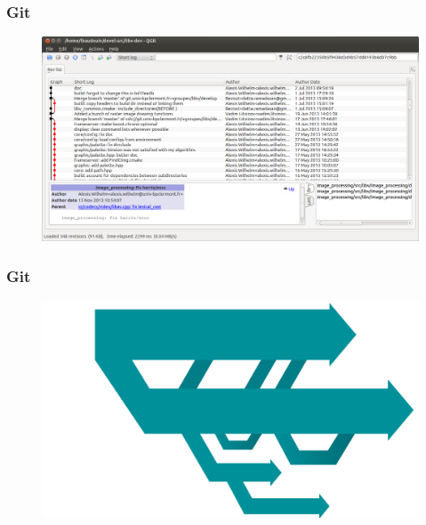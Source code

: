 \documentclass{beamer}
\begin{document}
\begin{frame}
  \frametitle{Git}

    \begin{figure}
    \includegraphics[height=0.7\textheight]{images/qgit}
    \end{figure}

\end{frame}

\begin{frame}
  \frametitle{Git}

    \begin{figure}
    \includegraphics[height=0.7\textheight]{images/branches}
    \end{figure}

\end{frame}


\subsection{}
\end{document}
